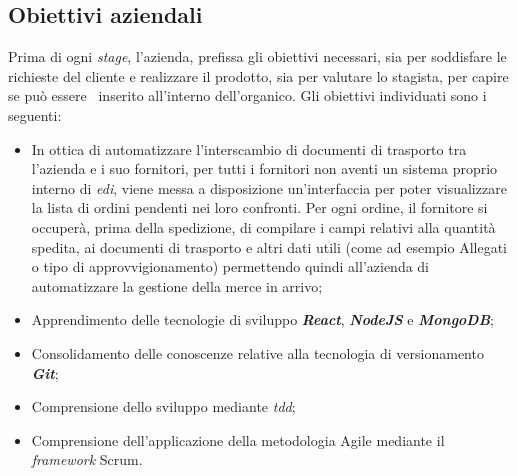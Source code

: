 \subsection{Obiettivi aziendali}
Prima di ogni \emph{stage}, l'azienda, prefissa gli obiettivi necessari, sia per soddisfare le richieste del cliente e realizzare il prodotto, sia per valutare lo stagista, per capire se può essere \
inserito all'interno dell'organico. Gli obiettivi individuati sono i seguenti:
\begin{itemize}
  \item In ottica di automatizzare l'interscambio di documenti di trasporto tra l'azienda e i suo fornitori, per tutti i fornitori non aventi un sistema proprio interno di \emph{\acrshort{edi}}, viene messa a disposizione un'interfaccia per poter visualizzare la lista di ordini pendenti nei loro confronti. Per ogni ordine, il fornitore si occuperà, prima della spedizione, di compilare i campi relativi alla quantità spedita, ai documenti di trasporto e altri dati utili (come ad esempio Allegati o tipo di approvvigionamento) permettendo quindi all'azienda di automatizzare la gestione della merce in arrivo;
  \item Apprendimento delle tecnologie di sviluppo \emph{\textbf{React}}, \emph{\textbf{NodeJS}} e \emph{\textbf{MongoDB}};
  \item Consolidamento delle conoscenze relative alla tecnologia di versionamento \emph{\textbf{Git}};
  \item Comprensione dello sviluppo mediante \emph{\acrshort{tdd}};
  \item Comprensione dell'applicazione della metodologia Agile mediante il \emph{framework} Scrum.
\end{itemize}

